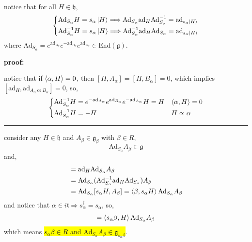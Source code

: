 \begin{itemize}
\begin{tcolorbox}[title=proof:]
		notice that for all $H \in \mathfrak{h}$,
		\begin{equation}
			\begin{dcases}
				\mathrm{Ad}_{S_\alpha} H = s_\alpha \ket{H} \Longrightarrow \mathrm{Ad}_{S_\alpha} \mathrm{ad}_H \mathrm{Ad}_{S_\alpha}^{- 1} = \mathrm{ad}_{s_\alpha \ket{H}} \\
				\mathrm{Ad}_{S_\alpha}^{- 1} H = s_\alpha \ket{H} \Longrightarrow \mathrm{Ad}_{S_\alpha}^{- 1} \mathrm{ad}_H \mathrm{Ad}_{S_\alpha} = \mathrm{ad}_{s_\alpha \ket{H}}
			\end{dcases}
		\end{equation}
		where $\mathrm{Ad}_{S_\alpha} = e^{\mathrm{ad}_{A_\alpha}} e^{- \mathrm{ad}_{B_\alpha}} e^{\mathrm{ad}_{A_\alpha}} \in \mathrm{End}(\mathfrak{g})$.
		
		\noindent\hdashrule[0.5ex]{\linewidth}{0.5pt}{1mm} %
		
		\textbf{proof:}
		
		notice that if $\braket{\alpha, H} = 0$, then $[H, A_\alpha] = [H, B_\alpha] = 0$, which implies $[\mathrm{ad}_H, \mathrm{ad}_{A_\alpha \ \text{or} \ B_\alpha}] = 0$, so,
		\begin{equation}
			\begin{dcases}
				\mathrm{Ad}_{S_\alpha}^{- 1} H = e^{- \mathrm{ad}_{A_\alpha}} e^{\mathrm{ad}_{B_\alpha}} e^{- \mathrm{ad}_{A_\alpha}} H = H & \braket{\alpha, H} = 0 \\
				\mathrm{Ad}_{S_\alpha}^{- 1} H = - H & H \propto \alpha
			\end{dcases}
		\end{equation}
		
		\noindent\rule[0.5ex]{\linewidth}{0.5pt} %
		
		consider any $H \in \mathfrak{h}$ and $A_\beta \in \mathfrak{g}_\beta$ with $\beta \in R$,
		\begin{equation}
			\mathrm{Ad}_{S_\alpha} A_\beta \in \mathfrak{g}
		\end{equation}
		and,
		\begin{align}
			[H, \mathrm{Ad}_{S_\alpha} A_\beta] &= \mathrm{ad}_H \mathrm{Ad}_{S_\alpha} A_\beta \notag \\
			&= \mathrm{Ad}_{S_\alpha} (\mathrm{Ad}_{S_\alpha}^{- 1} \mathrm{ad}_H \mathrm{Ad}_{S_\alpha}) A_\beta \notag \\
			&= \mathrm{Ad}_{S_\alpha} [s_\alpha H, A_\beta] = \braket{\beta, s_\alpha H} \mathrm{Ad}_{S_\alpha} A_\beta
		\end{align}
		and notice that $\alpha \in i \mathfrak{t} \Longrightarrow s_\alpha^\dag = s_\alpha$, so,
		\begin{equation}
			[H, \mathrm{Ad}_{S_\alpha} A_\beta] = \braket{s_\alpha \beta, H} \mathrm{Ad}_{S_\alpha} A_\beta
		\end{equation}
		which means \colorbox{yellow}{$s_\alpha \beta \in R$ and $\mathrm{Ad}_{S_\alpha} A_\beta \in \mathfrak{g}_{s_\alpha \beta}$}.
	\end{tcolorbox}
	

\end{itemize}
